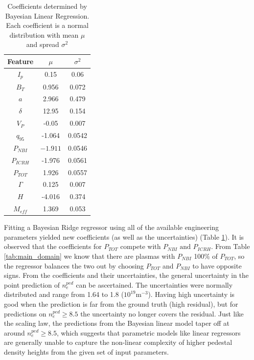 \documentclass[a4paper, twoside, final, 12pt]{article}
\begin{document}
{%
\begin{table}
\centering
\caption{Coefficients determined by Bayesian Linear Regression. Each coefficient is a normal distribution with mean $\mu$ and spread $\sigma^2$}\label{tab:new_coef}
\begin{tabular}{ | c | c | c |}
			\hline
			Feature & $\mu$ & $\sigma^2$ \\
			\hline
			$I_p$ & 0.15 & 0.06 \\
			$B_T$ & 0.956 & 0.072 \\
			$a$ & 2.966 & 0.479 \\
			$\delta$ & 12.95 & 0.154 \\
			$V_P$ & -0.05 & 0.007 \\
			$q_{95}$ & -1.064 & 0.0542 \\
			$P_{NBI}$ & $-1.911$ & 0.0546 \\
			$P_{ICRH}$ & -1.976 & 0.0561 \\
			$P_{TOT}$ & 1.926 & 0.0557 \\
			$\Gamma$ & 0.125 & 0.007 \\
			$H$ & -4.016 & 0.374  \\
			$M_{eff}$ & 1.369 & 0.053 \\
			\hline
\end{tabular}
\end{table}
Fitting a Bayesian Ridge regressor using all of the available engineering parameters yielded new coefficients (as well as the uncertainties) (Table \ref{tab:new_coef}). It is observed that the coefficients for $P_{TOT}$ compete with $P_{NBI} \text{ and }  P_{ICRH}$. 
From Table \ref{tab:main_domain} we know that there are plasmas with $P_{NBI}$ 100\% of $P_{TOT}$, so the regressor balances the two out by choosing $P_{TOT}$ and $P_{NBI}$ to have opposite signs.     
From the coefficients and their uncertainties, the general uncertainty in the point prediction of $n_e^{ped}$ can be ascertained. The uncertainties were normally distributed and range from 1.64 to 1.8 ($10^{19}\text{m}^{-3}$). Having high uncertainty is good when the prediction is far from the ground truth (high residual), but for predictions on $n_e^{ped} \geq 8.5$ the uncertainty no longer covers the residual. 
Just like the scaling law, the predictions from the Bayesian linear model taper off at around $n_e^{ped} \geq 8.5$, which suggests that parametric models like linear regressors are generally unable to capture the non-linear complexity of higher pedestal density heights from the given set of input parameters.


}
\end{document}
